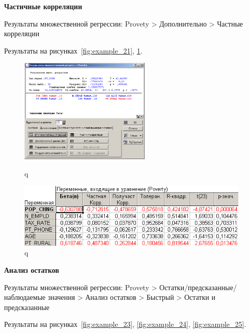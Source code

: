 \begin{center}
  \textbf{Частичные корреляции}
\end{center}

Результаты множественной регрессии: Provety > Дополнительно > Частные корреляции

Результаты на рисунках~\ref{fig:example_21}, \ref{fig:example_22}.

\begin{figure}[!h]
  \centering
  \begin{minipage}{0.49\textwidth}
    \centering

    \includegraphics[height=5cm]
    {inc/example_21.PNG}

    \caption{q}
    \label{fig:example_21}
  \end{minipage}
  \begin{minipage}{0.49\textwidth}
    \centering

    \includegraphics[width=0.99\textwidth]
    {inc/example_22.PNG}

    \caption{q}
    \label{fig:example_22}
  \end{minipage}
\end{figure}

\newpage

\begin{center}
  \textbf{Анализ остатков}
\end{center}

Результаты множественной регрессии: Provety > Остатки/предсказанные/наблюдаемые значения > Анализ остатков > Быстрый > Остатки и предсказанные

Результаты на рисунках~\ref{fig:example_23}, \ref{fig:example_24}, \ref{fig:example_25}.

